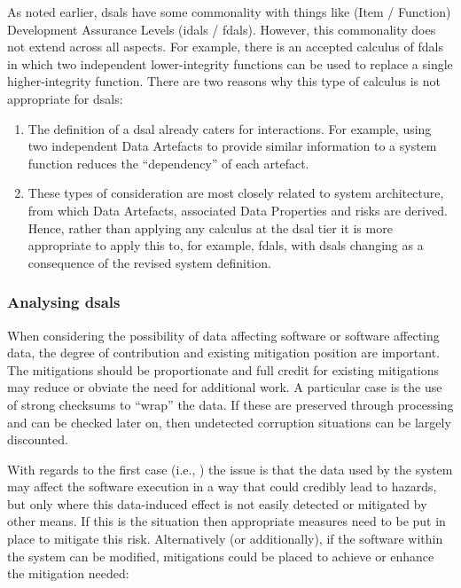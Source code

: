 As noted earlier, \glspl{dsal} have some commonality with things like (Item / Function) Development Assurance Levels (\glspl{idal} / \glspl{fdal}). However, this commonality does not extend across all aspects. For example, there is an accepted calculus of \glspl{fdal} in which two independent lower-integrity functions can be used to replace a single higher-integrity function. There are two reasons why this type of calculus is not appropriate for \glspl{dsal}:

\begin{enumerate}
  \item The definition of a \gls{dsal} already caters for interactions. For example, using two independent Data Artefacts to provide similar information to a system function reduces the ``dependency'' of each artefact.
  \item These types of consideration are most closely related to system architecture, from which Data Artefacts, associated Data Properties and risks are derived. Hence, rather than applying any calculus at the \gls{dsal} tier it is more appropriate to apply this to, for example, \glspl{fdal}, with \glspl{dsal} changing as a consequence of the revised system definition.
\end{enumerate}

\subsubsection{Analysing \glspl{dsal}}
When considering the possibility of data affecting software or software affecting data, the degree of contribution and existing mitigation position are important. The mitigations should be proportionate and full credit for existing mitigations may reduce or obviate the need for additional work. A particular case is the use of strong checksums to ``wrap'' the data. If these are preserved through processing and can be checked later on, then undetected  corruption situations can be largely discounted.

With regards to the first case (i.e., ) the issue is that the data used by the system may affect the software execution in a way that could credibly lead to hazards, but only where this data-induced effect is not easily detected or mitigated by other means. If this is the situation then appropriate measures need to be put in place  to mitigate this risk. Alternatively (or additionally), if the software within the system can be modified, mitigations could be placed  to achieve or enhance the mitigation needed:

